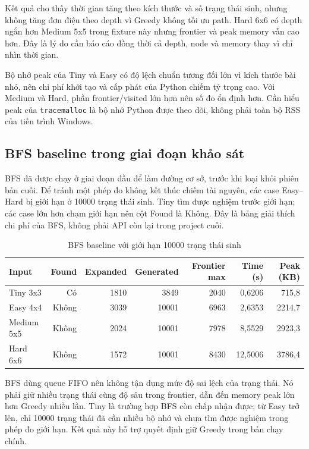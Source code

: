 \documentclass[12pt,a4paper]{article}
\newcommand{\code}[1]{\texttt{#1}}
\begin{document}
Kết quả cho thấy thời gian tăng theo kích thước và số trạng thái sinh, nhưng không tăng đơn điệu theo depth vì Greedy không tối ưu path. Hard 6x6 có depth ngắn hơn Medium 5x5 trong fixture này nhưng frontier và peak memory vẫn cao hơn. Đây là lý do cần báo cáo đồng thời cả depth, node và memory thay vì chỉ nhìn thời gian.

Bộ nhớ peak của Tiny và Easy có độ lệch chuẩn tương đối lớn vì kích thước bài nhỏ, nên chi phí khởi tạo và cấp phát của Python chiếm tỷ trọng cao. Với Medium và Hard, phần frontier/visited lớn hơn nên số đo ổn định hơn. Cần hiểu peak của \code{tracemalloc} là bộ nhớ Python được theo dõi, không phải toàn bộ RSS của tiến trình Windows.

\subsection{BFS baseline trong giai đoạn khảo sát}
BFS đã được chạy ở giai đoạn đầu để làm đường cơ sở, trước khi loại khỏi phiên bản cuối. Để tránh một phép đo không kết thúc chiếm tài nguyên, các case Easy--Hard bị giới hạn ở 10000 trạng thái sinh. Tiny tìm được nghiệm trước giới hạn; các case lớn hơn chạm giới hạn nên cột Found là Không. Đây là bảng giải thích chi phí của BFS, không phải API còn lại trong project cuối.

\begin{table}[H]
\centering
\caption{BFS baseline với giới hạn 10000 trạng thái sinh}
\label{tab:bfs}
\small
\begin{tabular}{lrrrrrr}
\toprule
Input & Found & Expanded & Generated & Frontier max & Time (s) & Peak (KB)\\
\midrule
Tiny 3x3 & Có & 1810 & 3849 & 2040 & 0,6206 & 715,8\\
Easy 4x4 & Không & 3039 & 10001 & 6963 & 2,6353 & 2214,7\\
Medium 5x5 & Không & 2024 & 10001 & 7978 & 8,5529 & 2923,3\\
Hard 6x6 & Không & 1572 & 10001 & 8430 & 12,5006 & 3786,4\\
\bottomrule
\end{tabular}
\end{table}

BFS dùng queue FIFO nên không tận dụng mức độ sai lệch của trạng thái. Nó phải giữ nhiều trạng thái cùng độ sâu trong frontier, dẫn đến memory peak lớn hơn Greedy nhiều lần. Tiny là trường hợp BFS còn chấp nhận được; từ Easy trở lên, chỉ 10000 trạng thái đã cần nhiều bộ nhớ và chưa tìm được nghiệm trong phép đo giới hạn. Kết quả này hỗ trợ quyết định giữ Greedy trong bản chạy chính.
\end{document}
